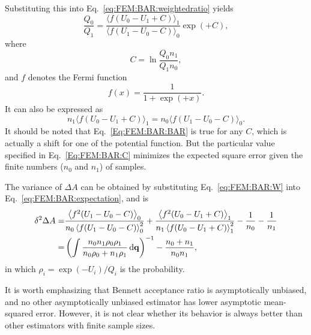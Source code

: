 Substituting this into Eq.~\ref{eq:FEM:BAR:weightedratio} yields
\begin{equation}
	\frac{Q_{0}}{Q_{1}}=\frac{\langle f(U_{0}-U_{1}+C)\rangle_{1}}{\langle f(U_{1}-U_{0}-C)\rangle_{0}}\exp{(+C)},
	\label{Eq:FEM:BAR:BAR}
\end{equation}
where
\begin{equation}
	C=\ln\frac{Q_{0}n_{1}}{Q_{1}n_{0}},
	\label{Eq:FEM:BAR:C}
\end{equation}
and $f$ denotes the Fermi function
\begin{equation}
	f(x)=\frac{1}{1+\exp{(+x)}}.
\end{equation}
It can also be expressed as\cite{ShirtsPRL2003}
\begin{equation}
	n_1\langle f(U_{0}-U_{1}+C)\rangle_{1}=n_0\langle f(U_{1}-U_{0}-C)\rangle_{0}.
\end{equation}
It should be noted that Eq.~\ref{Eq:FEM:BAR:BAR} is true for any $C$, which is actually a shift for one of the potential function. But the particular value specified in Eq.~\ref{Eq:FEM:BAR:C} minimizes the expected square error given the finite numbers ($n_0$ and $n_1$) of samples.

The variance of $\Delta A$ can be obtained by substituting Eq.~\ref{eq:FEM:BAR:W} into Eq.~\ref{eq:FEM:BAR:expectation}, and is 
\begin{align}
	\delta^2 \Delta A =&\frac{\left<f^2(U_{1}-U_{0}-C)\right>_0}{n_0\left<f(U_{1}-U_{0}-C)\right>_0^2}+\frac{\left<f^2(U_{0}-U_{1}+C)\right>_1}{n_1\left<f(U_{0}-U_{1}+C)\right>_1^2}-\frac{1}{n_0}-\frac{1}{n_1}\notag\\
	=&\left(\int \frac{n_0n_1\rho_0\rho_1}{n_0\rho_0+n_1\rho_1}\mathop{}\!\mathrm{d} \mathbf{q}\right)^{-1}-\frac{n_0+n_1}{n_0n_1},
\end{align}
in which $\rho_i=\exp{(-U_i)}/Q_i$ is the probability.

It is worth emphasizing that Bennett acceptance ratio is asymptotically unbiased, and no other asymptotically unbiased estimator has lower asymptotic mean-squared error. However, it is not clear whether its behavior is always better than other estimators with finite sample sizes.

